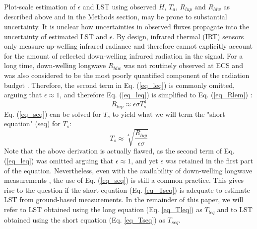\documentclass[fleqn,10pt]{wlscirep}
\begin{document}
Plot-scale estimation of $\epsilon$ and LST using observed $H$, $T_{a}$, $R_{lup}$ and $R_{ldw}$ as described above and in the Methods section, may be prone to substantial uncertainty. It is unclear how uncertainties in observed fluxes propagate into the uncertainty of estimated LST and $\epsilon$. By design, infrared thermal (IRT) sensors only measure up-welling infrared radiance and therefore cannot explicitly account for the amount of reflected down-welling infrared radiation in the signal. For a long time, down-welling longwave $R_{ldw}$ was not routinely observed at ECS \cite{wang_evaluation_2009-1} and was also considered to be the most poorly quantified component of the radiation budget \cite{trenberth2012tracking}. Therefore, the second term in Eq. (\ref{eq_leq}) is commonly omitted, arguing that $\epsilon\approx 1$, and therefore Eq. (\ref{eq_leq}) is simplified to Eq. (\ref{eq_Rlem}) \cite{crago_use_2014-3}:
\begin{equation}\label{eq_seq}
R_{lup} \approx \epsilon \sigma T_{s}^{4}
\end{equation} 
Eq. (\ref{eq_seq}) can be solved for $T_s$ to yield what we will term the "short equation" (seq) for $T_s$:
\begin{equation}\label{eq_Tseq}
T_{s} \approx \sqrt[4]{\frac{R_{lup}}{\epsilon \sigma}}
\end{equation} 
Note that the above derivation is actually flawed, as the second term of Eq. (\ref{eq_leq}) was omitted arguing that $\epsilon\approx 1$, and yet $\epsilon$ was retained in the first part of the equation. Nevertheless, even with the availability of down-welling longwave measurements \cite{stephens1995review}, the use of Eq. (\ref{eq_seq}) is still a common practice\cite{crago_use_2014,mallick2018bridging}. This gives rise to the question if the short equation (Eq. \ref{eq_Tseq}) is adequate to estimate LST from ground-based measurements. In the remainder of this paper, we will refer to LST obtained using the long equation (Eq. \ref{eq_Tleq}) as $T_{leq}$ and to LST obtained using the short equation (Eq. \ref{eq_Tseq}) as $T_{seq}$.

\end{document}
